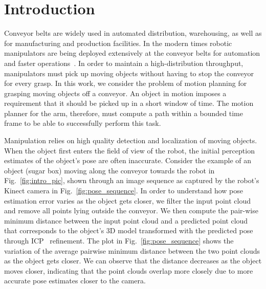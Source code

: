 \documentclass[conference]{IEEEtran}
\begin{document}
\IEEEpeerreviewmaketitle

\section{Introduction}

Conveyor belts are widely used in automated distribution, warehousing, as well as for manufacturing and production facilities. In the modern times robotic manipulators are being deployed extensively at the conveyor belts for automation and faster operations~\cite{zhang2018gilbreth}. In order to maintain a high-distribution throughput, manipulators must pick up moving objects without having to stop the conveyor for every grasp. In this work, we consider the problem of motion planning for grasping moving objects off a conveyor. An object in motion imposes a requirement that it should be picked up in a short window of time. The motion planner for the arm, therefore, must compute a path within a bounded time frame to be able to successfully perform this task.


    Manipulation relies on high quality detection and localization of moving objects. When the object first enters the field of view of the robot, the initial perception estimates of the object's pose are often inaccurate. Consider the example of an object (sugar box) moving along the conveyor towards the robot in Fig.~\ref{fig:intro_pic}, shown through an image sequence as captured by the robot's Kinect camera in Fig.~\ref{fig:pose_sequence}. In order to understand how pose estimation error varies as the object gets closer, we filter the input point cloud and remove all points lying outside the conveyor. We then compute the pair-wise minimum distance between the input point cloud and a predicted point cloud that corresponds to the object's 3D model transformed with the predicted pose through ICP~\cite{besl1992method} refinement. The plot in Fig.~\ref{fig:pose_sequence} shows the variation of the average pairwise minimum distance between the two point clouds as the object gets closer. We can observe that the distance decreases as the object moves closer, indicating that the point clouds overlap more closely due to more accurate pose estimates closer to the camera.
    
\end{document}
